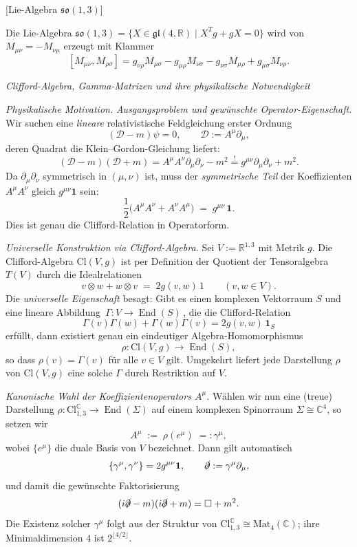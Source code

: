 \documentclass[10pt, letterpaper]{article}
\newcommand{\R}{\mathbb{R}}
\newcommand{\C}{\mathbb{C}}
\newcommand{\Cl}{\mathrm{Cl}}
\newcommand{\Mat}{\mathrm{Mat}}
\begin{document}
[Lie-Algebra $\mathfrak{so}(1,3)$]

Die Lie-Algebra $\mathfrak{so}(1,3)=\{X\in \mathfrak{gl}(4,\R)\mid X^T g + gX =0\}$ wird von $M_{\mu\nu}=-M_{\nu\mu}$ erzeugt mit Klammer
\[
[M_{\mu\nu},M_{\rho\sigma}]
= g_{\nu\rho} M_{\mu\sigma}-g_{\mu\rho} M_{\nu\sigma}
 - g_{\nu\sigma} M_{\mu\rho}+g_{\mu\sigma} M_{\nu\rho}.
\]


\emph{Clifford-Algebra, Gamma-Matrizen und ihre physikalische Notwendigkeit}

\emph{Physikalische Motivation.}
\emph{Ausgangsproblem und gewünschte Operator-Eigenschaft.}
Wir suchen eine \emph{lineare} relativistische Feldgleichung erster Ordnung
\[
(\mathcal D - m)\psi=0,\qquad \mathcal D := A^\mu \partial_\mu,
\]
deren Quadrat die Klein--Gordon-Gleichung liefert:
\[
(\mathcal D - m)(\mathcal D + m) = A^\mu A^\nu \partial_\mu\partial_\nu - m^2
\stackrel{!}{=} g^{\mu\nu}\partial_\mu\partial_\nu + m^2.
\]
Da $\partial_\mu\partial_\nu$ symmetrisch in $(\mu,\nu)$ ist, muss der \emph{symmetrische Teil} der Koeffizienten $A^\mu A^\nu$ gleich $g^{\mu\nu}\mathbf 1$ sein:
\[
\frac12\big(A^\mu A^\nu + A^\nu A^\mu\big) \;=\; g^{\mu\nu}\,\mathbf 1.
\]
Dies ist genau die Clifford-Relation in Operatorform.

\emph{Universelle Konstruktion via Clifford-Algebra.}
Sei $V:=\R^{1,3}$ mit Metrik $g$. Die Clifford-Algebra $\Cl(V,g)$ ist per Definition der Quotient der Tensoralgebra $T(V)$ durch die Idealrelationen
\[
v\otimes w + w\otimes v \;=\; 2g(v,w)\,1 \qquad (v,w\in V).
\]
Die \emph{universelle Eigenschaft} besagt:
Gibt es einen komplexen Vektorraum $S$ und eine lineare Abbildung
$\,\Gamma:V\to \operatorname{End}(S)\,$, die die Clifford-Relation
\[
\Gamma(v)\Gamma(w)+\Gamma(w)\Gamma(v)=2g(v,w)\,\mathbf 1_S
\]
erfüllt, dann existiert genau ein eindeutiger Algebra-Homomorphismus
\[
\rho:\Cl(V,g)\longrightarrow \operatorname{End}(S),
\]
so dass $\rho(v)=\Gamma(v)$ für alle $v\in V$ gilt. Umgekehrt liefert jede Darstell\-ung $\rho$ von $\Cl(V,g)$ eine solche $\Gamma$ durch Restriktion auf $V$.

\emph{Kanonische Wahl der Koeffizientenoperators $A^\mu$.}
Wählen wir nun eine (treue) Darstellung $\rho:\Cl_{1,3}^\C\to \operatorname{End}(\Sigma)$ auf einem komplexen Spinorraum $\Sigma\cong\C^4$, so setzen wir
\[
A^\mu \;:=\; \rho(e^\mu) \;=: \gamma^\mu,
\]
wobei $\{e^\mu\}$ die duale Basis von $V$ bezeichnet. Dann gilt automatisch
\[
\{\gamma^\mu,\gamma^\nu\}=2g^{\mu\nu}\mathbf 1,\qquad
\slashed{\partial}:=\gamma^\mu\partial_\mu,
\]
und damit die gewünschte Faktorisierung
\[
(i\slashed{\partial}-m)(i\slashed{\partial}+m)=\Box+m^2.
\]
Die Existenz solcher $\gamma^\mu$ folgt aus der Struktur von $\Cl_{1,3}^\C\cong \Mat_4(\C)$; ihre Minimaldimension $4$ ist $2^{\lfloor 4/2\rfloor}$.
\end{document}
